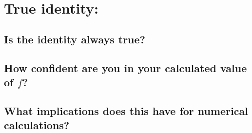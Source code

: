 \documentclass[12pt]{article}
\begin{document}
\section*{True identity:}
\begin{itemize}
\subsection*{Is the identity always true?}
\subsection*{How confident are you in your calculated value of $f$?}
\subsection*{What implications does this have for numerical calculations?}
\end{itemize}
\end{document}
